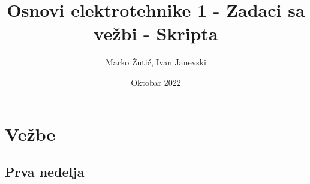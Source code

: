 \documentclass{report}
\title{Osnovi elektrotehnike 1 - Zadaci sa ve\v{z}bi - Skripta}
\author{Marko \v{Z}uti\'{c}, Ivan Janevski}
\date{Oktobar 2022}
\begin{document}
\maketitle
\newpage
\tableofcontents
\newpage
\titleformat{\chapter}[display]{\normalfont\bfseries}{}{0pt}{\Huge}
\chapter{Ve\v{z}be}
\section{Prva nedelja}




\end{document}
